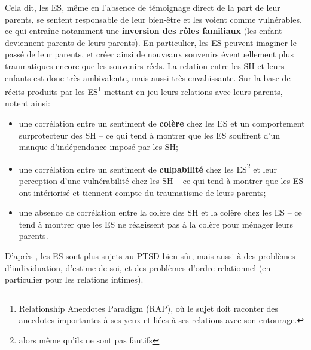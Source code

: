 \documentclass[french]{article}
\begin{document}
			Cela dit, les ES, même en l'absence de témoignage direct de la part de leur parents, se sentent responsable de leur bien-être et les voient comme vulnérables, ce qui entraîne notamment une \textbf{inversion des rôles familiaux} (les enfant deviennent parents de leurs parents). En particulier, les ES peuvent imaginer le passé de leur parents, et créer ainsi de nouveaux souvenirs éventuellement plus traumatiques encore que les souvenirs réels. La relation entre les SH et leurs enfants est donc très ambivalente, mais aussi très envahissante. Sur la base de récits produits par les ES\footnote{Relationship Anecdotes Paradigm (RAP), où le sujet doit raconter des anecdotes importantes à ses yeux et liées à ses relations avec son entourage.} mettant en jeu leurs relations avec leurs parents, \cite{wiseman2006} notent ainsi:
			\begin{itemize}
				\item une corrélation entre un sentiment de \textbf{colère} chez les ES et un comportement surprotecteur des SH -- ce qui tend à montrer que les ES souffrent d'un manque d'indépendance imposé par les SH;
				\item une corrélation entre un sentiment de \textbf{culpabilité} chez les ES\footnote{alors même qu'ils ne sont pas fautifs} et leur perception d'une vulnérabilité chez les SH -- ce qui tend à montrer que les ES ont intériorisé et tiennent compte du traumatisme de leurs parents;
				\item une absence de corrélation entre la colère des SH et la colère chez les ES -- ce tend à montrer que les ES ne réagissent pas à la colère pour ménager leurs parents.
			\end{itemize}\vspace{2mm}
			D'après \cite{fossion2003}, les ES sont plus sujets au PTSD bien sûr, mais aussi à des problèmes d'individuation, d'estime de soi, et des problèmes d'ordre relationnel (en particulier pour les relations intimes).\\
			
\end{document}
